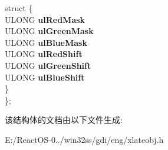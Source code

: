 \begin{DoxyCompactItemize}
\begin{tabbing}
\mbox{\label{union___e_x_l_a_t_e_o_b_j_1_1_0D3747_abcdf945e0191670f12307b3b57d4dfc1}} 
\>struct \{\\
\>\>ULONG {\bfseries ulRedMask}\\
\>\>ULONG {\bfseries ulGreenMask}\\
\>\>ULONG {\bfseries ulBlueMask}\\
\>\>ULONG {\bfseries ulRedShift}\\
\>\>ULONG {\bfseries ulGreenShift}\\
\>\>ULONG {\bfseries ulBlueShift}\\
\>\} \\
\}; \\

\end{tabbing}\end{DoxyCompactItemize}


该结构体的文档由以下文件生成\+:\begin{DoxyCompactItemize}
\item 
E\+:/\+React\+O\+S-\/0../win32ss/gdi/eng/xlateobj.\+h\end{DoxyCompactItemize}
